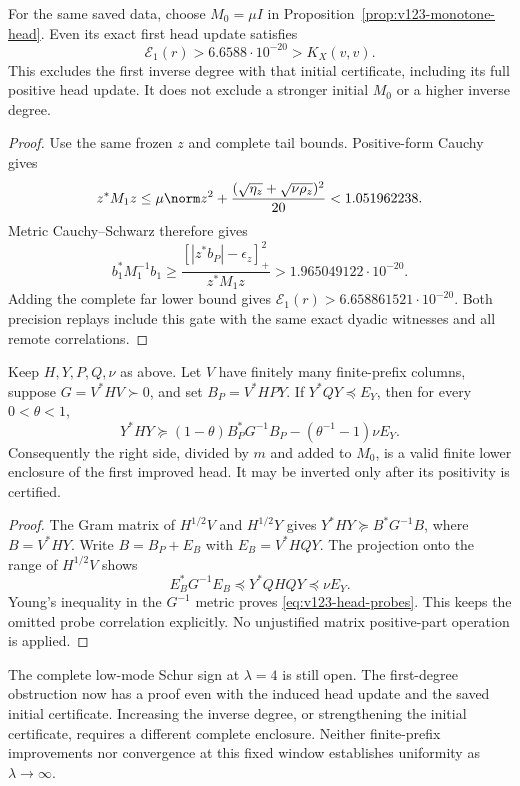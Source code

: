 \begin{corollary}
\label{cor:v123-updated-first-fails}
For the same saved data, choose $M_0=\mu I$ in
Proposition~\ref{prop:v123-monotone-head}. Even its exact first
head update satisfies
\[
 \mathcal E_1(r)>6.6588\cdot10^{-20}>K_X(v,v).
\]
This excludes the first inverse degree with that initial certificate,
including its full positive head update. It does not exclude a
stronger initial $M_0$ or a higher inverse degree.
\end{corollary}
\begin{proof}
Use the same frozen $z$ and complete tail bounds. Positive-form
Cauchy gives
\[
 z^*M_1z\le\mu\norm z^2+
 \frac{(\sqrt{\eta_z}+\sqrt{\nu\rho_z})^2}{20}
       <1.051962238.
\]
Metric Cauchy--Schwarz therefore gives
\[
 b_1^*M_1^{-1}b_1
 \ge\frac{[|z^*b_P|-\epsilon_z]_+^2}{z^*M_1z}
       >1.965049122\cdot10^{-20}.
\]
Adding the complete far lower bound gives
$\mathcal E_1(r)>6.658861521\cdot10^{-20}$.
Both precision replays include this gate with the same exact
dyadic witnesses and all remote correlations.
\end{proof}

\begin{proposition}
\label{prop:v123-head-probes}
Keep $H,Y,P,Q,\nu$ as above. Let $V$ have finitely many
finite-prefix columns, suppose $G=V^*HV\succ0$, and set
$B_P=V^*HPY$. If $Y^*QY\preceq E_Y$, then for every
$0<\theta<1$,
\begin{equation}\label{eq:v123-head-probes}
 Y^*HY\succeq
 (1-\theta)B_P^*G^{-1}B_P
       -(\theta^{-1}-1)\nu E_Y.
\end{equation}
Consequently the right side, divided by $m$ and added to $M_0$,
is a valid finite lower enclosure of the first improved head.
It may be inverted only after its positivity is certified.
\end{proposition}
\begin{proof}
The Gram matrix of $H^{1/2}V$ and $H^{1/2}Y$ gives
$Y^*HY\succeq B^*G^{-1}B$, where $B=V^*HY$.
Write $B=B_P+E_B$ with $E_B=V^*HQY$.
The projection onto the range of $H^{1/2}V$ shows
\[
 E_B^*G^{-1}E_B\preceq Y^*QHQY\preceq\nu E_Y.
\]
Young's inequality in the $G^{-1}$ metric proves
\eqref{eq:v123-head-probes}. This keeps the omitted probe
correlation explicitly. No unjustified matrix positive-part
operation is applied.
\end{proof}

The complete low-mode Schur sign at $\lambda=4$ is still open.
The first-degree obstruction now has a proof even with the
induced head update and the saved initial certificate. Increasing
the inverse degree, or strengthening the initial certificate,
requires a different complete enclosure.
Neither finite-prefix improvements nor convergence at this fixed
window establishes uniformity as $\lambda\to\infty$.
